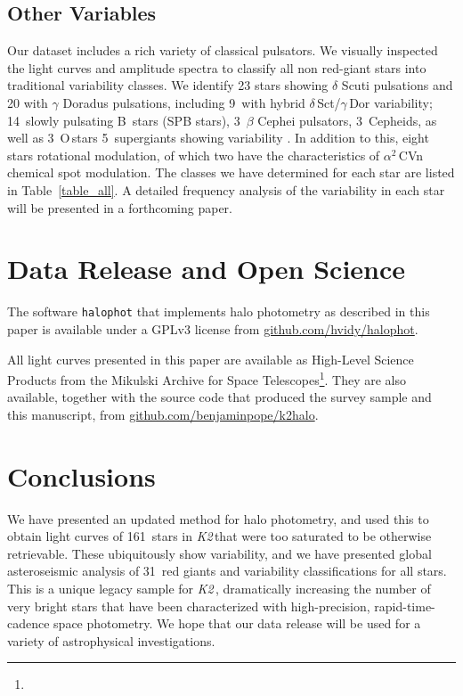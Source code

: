 \documentclass[modern]{aastex62}
\newcommand\ktwo{\emph{K2}\,}
\begin{document}
\subsection{Other Variables}
\label{sec:variables}

Our dataset includes a rich variety of classical pulsators. We visually inspected the light curves and amplitude spectra to classify all non red-giant stars into traditional variability classes. We identify 23 stars showing $\delta$ Scuti pulsations and 20 with $\gamma$ Doradus pulsations, including 9~with hybrid $\delta$\,Sct/$\gamma$\,Dor variability; 14~slowly pulsating B~stars (SPB stars), 3~$\beta$ Cephei pulsators, 3~Cepheids, as well as 3~O\,stars 5~supergiants showing variability \citep[as in][]{Aerts2018,bowman19}. In addition to this, eight stars rotational modulation, of which two have the characteristics of $\alpha^2$\,CVn chemical spot modulation. The classes we have determined for each star are listed in Table~\ref{table_all}. A detailed frequency analysis of the variability in each star will be presented in a forthcoming paper.


\section{Data Release and Open Science}

The software \texttt{halophot} that implements halo photometry as described in this paper is available under a GPLv3 license from \href{https://github.com/hvidy/halophot}{github.com/hvidy/halophot}. 

All light curves presented in this paper are available as High-Level Science Products from the Mikulski Archive for Space Telescopes\footnote{}.  They are also available, together with the source code that produced the survey sample and this manuscript, from \href{https://github.com/benjaminpope/k2halo}{github.com/benjaminpope/k2halo}.

\section{Conclusions}
\label{sec:conclusions}

We have presented an updated method for halo photometry, and used this to obtain light curves of 161~stars in \ktwo that were too saturated to be otherwise retrievable. These ubiquitously show variability, and we have presented global asteroseismic analysis of 31~red giants and variability classifications for all stars. This is a unique legacy sample for \ktwo, dramatically increasing the number of very bright stars that have been characterized with high-precision, rapid-time-cadence space photometry. We hope that our data release will be used for a variety of astrophysical investigations.
\end{document}
